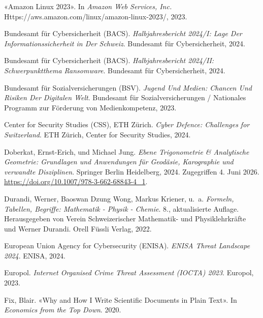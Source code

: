 \documentclass[
  nswissgerman,
  a4paper,
  DIV=11,
  numbers=noendperiod,
  ngerman]{scrreprt}
\newlength{\cslhangindent}
\newenvironment{CSLReferences}[2] %
 {\begin{list}{}{%
  \setlength{\itemindent}{0pt}
  \setlength{\leftmargin}{0pt}
  \setlength{\parsep}{0pt}
  \ifodd #1
   \setlength{\leftmargin}{\cslhangindent}
   \setlength{\itemindent}{-1\cslhangindent}
  \fi
  \setlength{\itemsep}{#2\baselineskip}}}
 {\end{list}}
\begin{document}
\protect{}\label{refs}
\begin{CSLReferences}{1}{1}
{«Amazon {Linux} 2023»}. In \emph{Amazon Web Services, Inc.}
Https://aws.amazon.com/linux/amazon-linux-2023/, 2023.

Bundesamt für Cybersicherheit (BACS). \emph{Halbjahresbericht 2024/{I}:
{Lage} Der Informationssicherheit in Der Schweiz}. Bundesamt für
Cybersicherheit, 2024.

Bundesamt für Cybersicherheit (BACS). \emph{Halbjahresbericht 2024/{II}:
{Schwerpunktthema} Ransomware}. Bundesamt für Cybersicherheit, 2024.

Bundesamt für Sozialversicherungen (BSV). \emph{Jugend Und Medien:
{Chancen} Und Risiken Der Digitalen Welt}. Bundesamt für
Sozialversicherungen / Nationales Programm zur Förderung von
Medienkompetenz, 2023.

Center for Security Studies (CSS), ETH Zürich. \emph{Cyber Defence:
{Challenges} for Switzerland}. ETH Zürich, Center for Security Studies,
2024.

Doberkat, Ernst-Erich, und Michael Jung. \emph{Ebene Trigonometrie \&
Analytische Geometrie: Grundlagen und Anwendungen für Geodäsie,
Karographie und verwandte Disziplinen}. Springer Berlin Heidelberg,
2024. Zugegriffen 4. Juni 2026.
\url{https://doi.org/10.1007/978-3-662-68843-4_1}.

Durandi, Werner, Baoswan Dzung Wong, Markus Kriener, u.~a.
\emph{{Formeln, Tabellen, Begriffe: Mathematik - Physik - Chemie}}. 8.,
aktualisierte Auflage. Herausgegeben von Verein Schweizerischer
Mathematik- und Physiklehrkräfte und Werner Durandi. Orell Füssli
Verlag, 2022.

European Union Agency for Cybersecurity (ENISA). \emph{{ENISA} Threat
Landscape 2024}. ENISA, 2024.

Europol. \emph{Internet Organised Crime Threat Assessment ({IOCTA})
2023}. Europol, 2023.

Fix, Blair. {«Why and {How I Write Scientific Documents} in {Plain
Text}»}. In \emph{Economics from the Top Down}. 2020.


\end{CSLReferences}
\end{document}
